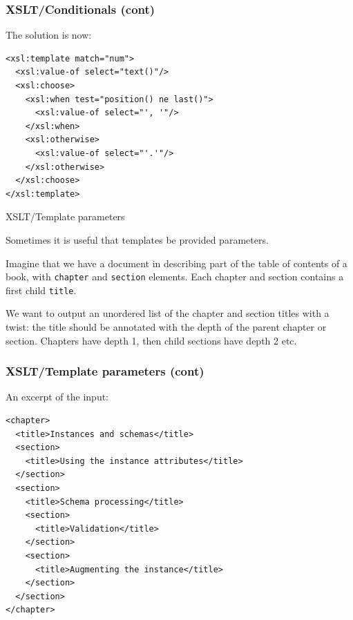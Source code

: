 %
\begin{frame}[containsverbatim]
\frametitle{XSLT/Conditionals (cont)}

The solution is now:
{\small
\begin{verbatim}
<xsl:template match="num">
  <xsl:value-of select="text()"/>
  <xsl:choose>
    <xsl:when test="position() ne last()">
      <xsl:value-of select="', '"/>
    </xsl:when>
    <xsl:otherwise>
      <xsl:value-of select="'.'"/>
    </xsl:otherwise>
  </xsl:choose>
</xsl:template>
\end{verbatim}
}

\end{frame}

%
\begin{frame}{XSLT/Template parameters}

Sometimes it is useful that templates be provided parameters.

\bigskip

Imagine that we have a document in \XML describing part of the table
of contents of a book, with \texttt{chapter} and \texttt{section}
elements. Each chapter and section contains a first child
\texttt{title}.

\bigskip

We want to output an unordered \XHTML list of the chapter and section
titles with a twist: the title should be annotated with the depth of
the parent chapter or section. Chapters have depth 1, then child
sections have depth 2 etc.

\end{frame}

%
\begin{frame}[containsverbatim]
\frametitle{XSLT/Template parameters (cont)}

An excerpt of the input:
{\small
\begin{verbatim}
<chapter>
  <title>Instances and schemas</title>
  <section>
    <title>Using the instance attributes</title>
  </section>
  <section>
    <title>Schema processing</title>
    <section>
      <title>Validation</title>
    </section>
    <section>
      <title>Augmenting the instance</title>
    </section>
  </section>
</chapter>
\end{verbatim}
}

\end{frame}

